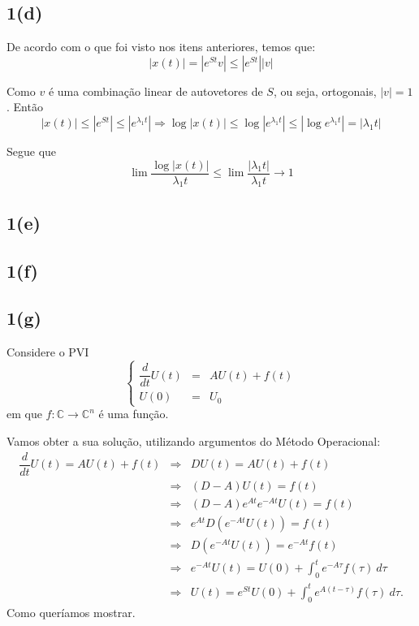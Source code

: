 \subsection*{1(d)}

De acordo com o que foi visto nos itens anteriores, temos que:
\[
|x(t)| = |e^{S t} v| \le |e^{S t}||v|
\]



Como \(v\) é uma combinação linear de autovetores de \(S\), ou seja, ortogonais, \(|v| = 1\). Então
\[
|x(t)| \le |e^{S t}| \le |e^{\lambda_1 t}|
\Rightarrow
\log|x(t)| \le \log|e^{\lambda_1 t}| \le |\log e^{\lambda_1 t}| = |\lambda_1 t|
\]

Segue que
\[
\lim \dfrac{\log|x(t)|}{\lambda_1 t}
\le
\lim \dfrac{|\lambda_1 t|}{\lambda_1 t} \to 1
\]






\subsection*{1(e)}

\subsection*{1(f)}

\subsection*{1(g)}


Considere o PVI
\[\left\{\begin{array}{rcl}
\dfrac{d}{dt}U(t) &=& A U(t) + f(t) \\[0.5cm]
U(0) &=& U_0
\end{array}\right.\]
em que $f: \mathbb{C} \to \mathbb{C}^n$ é uma função.

Vamos obter a sua solução, utilizando argumentos do Método Operacional:
\[\begin{array}{rcl}
\dfrac{d}{dt}U(t) = AU(t) + f(t)
&\Rightarrow&
DU(t) = AU(t) + f(t) \\[0.5cm]
&\Rightarrow&
\left(D - A\right) U(t) = f(t) \\[0.5cm]
&\Rightarrow&
\left(D - A\right) e^{At} e^{-At} U(t) = f(t)  \\[0.5cm]
&\Rightarrow&
e^{At} D\left(e^{-At} U(t)\right) = f(t)  \\[0.5cm]
&\Rightarrow&
D\left(e^{-At} U(t)\right) = e^{-At} f(t) \\[0.5cm]
&\Rightarrow&
e^{-At} U(t) = U(0) + \displaystyle\int_{0}^{t} e^{-A \tau} f(\tau)\ d\tau \\[0.5cm]
&\Rightarrow&
U(t) = e^{St} U(0) + \displaystyle\int_{0}^{t} e^{A (t-\tau)} f(\tau)\ d\tau.
\end{array}\]
Como queríamos mostrar.

